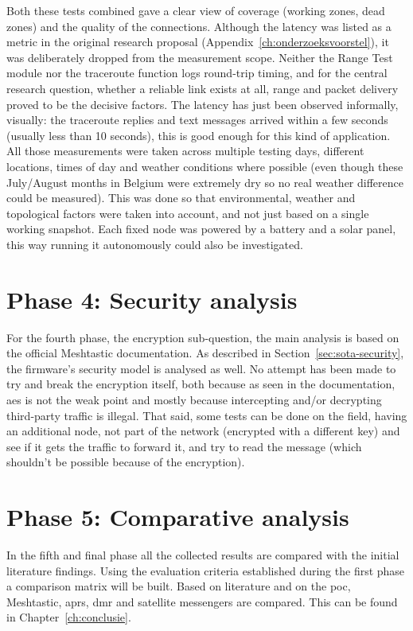 Both these tests combined gave a clear view of coverage (working zones, dead zones) and the quality of the connections.
Although the latency was listed as a metric in the original research proposal (Appendix~\ref{ch:onderzoeksvoorstel}), it was deliberately dropped from the measurement scope.
Neither the Range Test module nor the traceroute function logs round-trip timing, and for the central research question, whether a reliable link exists at all, range and packet delivery proved to be the decisive factors.
The latency has just been observed informally, visually: the traceroute replies and text messages arrived within a few seconds (usually less than 10 seconds), this is good enough for this kind of application.
All those measurements were taken across multiple testing days, different locations, times of day and weather conditions where possible (even though these July/August months in Belgium were extremely dry so no real weather difference could be measured).
This was done so that environmental, weather and topological factors were taken into account, and not just based on a single working snapshot.
Each fixed node was powered by a battery and a solar panel, this way running it autonomously could also be investigated.

\section{Phase 4: Security analysis}%
\label{sec:method-security}

For the fourth phase, the encryption sub-question, the main analysis is based on the official Meshtastic documentation.
As described in Section~\ref{sec:sota-security}, the firmware's security model is analysed as well.
No attempt has been made to try and break the encryption itself, both because as seen in the documentation, \gls{aes} is not the weak point and mostly because intercepting and/or decrypting third-party traffic is illegal.
That said, some tests can be done on the field, having an additional node, not part of the network (encrypted with a different key) and see if it gets the traffic to forward it, and try to read the message (which shouldn't be possible because of the encryption).

\section{Phase 5: Comparative analysis}%
\label{sec:method-comparison}

In the fifth and final phase all the collected results are compared with the initial literature findings.
Using the evaluation criteria established during the first phase a comparison matrix will be built.
Based on literature and on the \gls{poc}, Meshtastic, \gls{aprs}, \gls{dmr} and satellite messengers are compared. This can be found in Chapter~\ref{ch:conclusie}.